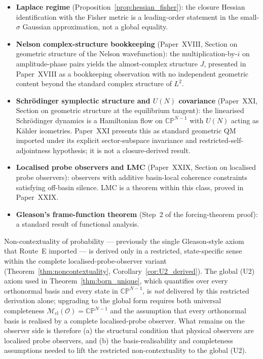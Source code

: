 \documentclass[12pt]{article}
\newcommand{\Ocal}{\mathcal{O}}
\newcommand{\Mcl}{\mathcal{M}_{\mathrm{cl}}}
\begin{document}
\begin{itemize}
    \item \textbf{Laplace regime} (Proposition~\ref{prop:hessian_fisher}): the closure Hessian identification with the Fisher metric is a leading-order statement in the small-$\sigma$ Gaussian approximation, not a global equality.
    \item \textbf{Nelson complex-structure bookkeeping} (Paper~XVIII, Section on geometric structure of the Nelson wavefunction): the multiplication-by-$i$ on amplitude-phase pairs yields the almost-complex structure $J$, presented in Paper~XVIII as a bookkeeping observation with no independent geometric content beyond the standard complex structure of $L^2$.
    \item \textbf{Schr\"odinger symplectic structure and $U(N)$ covariance} (Paper~XXI, Section on geometric structure at the equilibrium tangent): the linearised Schr\"odinger dynamics is a Hamiltonian flow on $\mathbb{CP}^{N-1}$ with $U(N)$ acting as K\"ahler isometries. Paper~XXI presents this as standard geometric QM imported under its explicit sector-subspace invariance and restricted-self-adjointness hypothesis; it is not a closure-derived result.
    \item \textbf{Localised probe observers and LMC} (Paper~XXIX, Section on localised probe observers): observers with additive basin-local coherence constraints satisfying off-basin silence. LMC is a theorem within this class, proved in Paper~XXIX.
    \item \textbf{Gleason's frame-function theorem} (Step~2 of the forcing-theorem proof): a standard result of functional analysis.
\end{itemize}

Non-contextuality of probability --- previously the single Gleason-style axiom that Route~E imported --- is derived only in a restricted, state-specific sense within the complete localised-probe-observer variant (Theorem~\ref{thm:noncontextuality}, Corollary~\ref{cor:U2_derived}). The global (U2) axiom used in Theorem~\ref{thm:born_unique}, which quantifies over every orthonormal basis and every state in $\mathbb{CP}^{N-1}$, is \emph{not} delivered by this restricted derivation alone; upgrading to the global form requires both universal completeness $\Mcl(\Ocal) = \mathbb{CP}^{N-1}$ and the assumption that every orthonormal basis is realised by a complete localised-probe observer. What remains on the observer side is therefore (a) the structural condition that physical observers are localised probe observers, and (b) the basis-realisability and completeness assumptions needed to lift the restricted non-contextuality to the global (U2).
\end{document}

